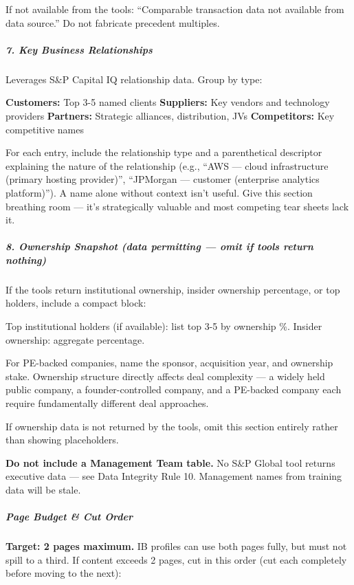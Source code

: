 \documentclass[11pt]{article}
\begin{document}
If not available from the tools: ``Comparable transaction data not available from data source.'' Do not fabricate precedent multiples.


\subparagraph{7. Key Business Relationships}\mbox{}\par
Leverages S\&P Capital IQ relationship data. Group by type:


\textbf{Customers:} Top 3-5 named clients \textbf{Suppliers:} Key vendors and technology providers \textbf{Partners:} Strategic alliances, distribution, JVs \textbf{Competitors:} Key competitive names


For each entry, include the relationship type and a parenthetical descriptor explaining the nature of the relationship (e.g., ``AWS — cloud infrastructure (primary hosting provider)'', ``JPMorgan — customer (enterprise analytics platform)''). A name alone without context isn't useful. Give this section breathing room — it's strategically valuable and most competing tear sheets lack it.


\subparagraph{8. Ownership Snapshot (data permitting — omit if tools return nothing)}\mbox{}\par
If the tools return institutional ownership, insider ownership percentage, or top holders, include a compact block:


Top institutional holders (if available): list top 3-5 by ownership \%. Insider ownership: aggregate percentage.


For PE-backed companies, name the sponsor, acquisition year, and ownership stake. Ownership structure directly affects deal complexity — a widely held public company, a founder-controlled company, and a PE-backed company each require fundamentally different deal approaches.


If ownership data is not returned by the tools, omit this section entirely rather than showing placeholders.


\textbf{Do not include a Management Team table.} No S\&P Global tool returns executive data — see Data Integrity Rule 10. Management names from training data will be stale.


\subparagraph{Page Budget \& Cut Order}\mbox{}\par

\textbf{Target: 2 pages maximum.} IB profiles can use both pages fully, but must not spill to a third. If content exceeds 2 pages, cut in this order (cut each completely before moving to the next):
\end{document}
